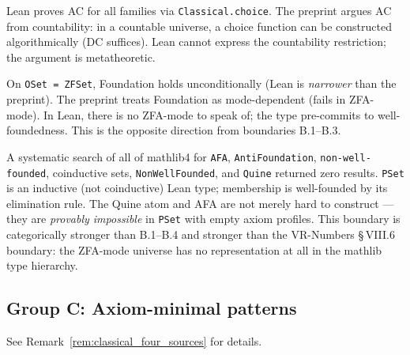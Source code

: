 \begin{remark}
\label{rem:B3_choice}
\leanok
{}
Lean proves AC for all families via \texttt{Classical.choice}.  The
preprint argues AC from countability: in a countable universe, a choice
function can be constructed algorithmically (DC suffices).  Lean cannot
express the countability restriction; the argument is metatheoretic.
\end{remark}

\begin{remark}
\label{rem:B4_found}
\leanok
{}
On \texttt{OSet = ZFSet}, Foundation holds unconditionally (Lean is
\emph{narrower} than the preprint).  The preprint treats Foundation as
mode-dependent (fails in ZFA-mode).  In Lean, there is no ZFA-mode to
speak of; the type pre-commits to well-foundedness.  This is the
opposite direction from boundaries B.1--B.3.
\end{remark}

\begin{remark}
\label{rem:B5_zfa}
\leanok
{}
A systematic search of all of mathlib4 for \texttt{AFA},
\texttt{AntiFoundation}, \texttt{non-well-founded}, coinductive sets,
\texttt{NonWellFounded}, and \texttt{Quine} returned zero results.
\texttt{PSet} is an inductive (not coinductive) Lean type; membership
is well-founded by its elimination rule.  The Quine atom and AFA are
not merely hard to construct --- they are \emph{provably impossible}
in \texttt{PSet} with empty axiom profiles.  This boundary is
categorically stronger than B.1--B.4 and stronger than the
VR-Numbers §\,VIII.6 boundary: the ZFA-mode universe has no
representation at all in the mathlib type hierarchy.
\end{remark}

\subsection*{Group C: Axiom-minimal patterns}

\begin{remark}
\label{rem:C1_classical}
\leanok
See Remark~\ref{rem:classical_four_sources} for details.
\end{remark}

